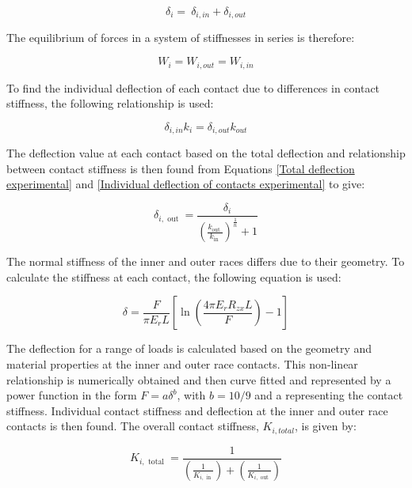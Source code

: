 \begin{equation}\label{Total deflection experimental}
\delta_i=\ \delta_{i,in}+\delta_{i,out}
\end{equation}

The equilibrium of forces in a system of stiffnesses in series is therefore:

\begin{equation}\label{Equilibrium of force experimental}
W_i=W_{i,out}=W_{i,in}
\end{equation}

To find the individual deflection of each contact due to differences in contact stiffness, the following relationship is used:

\begin{equation}\label{Individual deflection of contacts experimental}
{\delta_{i,in}}k_i={\delta_{i,out}}k_{out}
\end{equation}

The deflection value at each contact based on the total deflection and relationship between contact stiffness is then found from Equations \ref{Total deflection experimental} and \ref{Individual deflection of contacts experimental} to give:

\begin{equation}\label{Deflection at each contact}
	\delta_{i, \text { out }}=\frac{\delta_i}{\left(\frac{k_{\text {out }}}{k_{\text {in }}}\right)^{\frac{1}{n}}+1}
\end{equation}

The normal stiffness of the inner and outer races differs due to their geometry. To calculate the stiffness at each contact, the following equation is used: 

\begin{equation}\label{Contact stiffness experimental}
	\delta=\frac{F}{\pi E_r L}\left[\ln \left(\frac{4 \pi E_r R_{z x} L}{F}\right)-1\right]
\end{equation}

The deflection for a range of loads is calculated based on the geometry and material properties at the inner and outer race contacts. This non-linear relationship is numerically obtained and then curve fitted and represented by a power function in the form $F=a\delta^b$, with $b=10/9$ and a representing the contact stiffness. Individual contact stiffness and deflection at the inner and outer race contacts is then found. The overall contact stiffness, $K_{i,total}$, is given by:

\begin{equation}\label{Overall contact stiffness}
	K_{i, \text { total }}=\frac{1}{\left(\frac{1}{K_{i, \text { in }}}\right)+\left(\frac{1}{K_{i, \text { out }}}\right)}
\end{equation}

